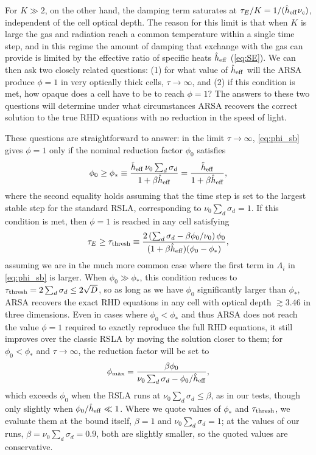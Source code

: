 \documentclass[preprint,12pt,authoryear]{elsarticle}
\begin{document}
For $K \gg 2$, on the other hand, the damping term saturates at $\tau_E/K = 1/(\hat{h}_{\rm eff}\nu_c)$, independent of the cell optical depth. The reason for this limit is that when $K$ is large the gas and radiation reach a common temperature within a single time step, and in this regime the amount of damping that exchange with the gas can provide is limited by the effective ratio of specific heats $\hat{h}_{\rm eff}$ (\autoref{eq:SE}). We can then ask two closely related questions: (1) for what value of $\hat{h}_{\rm eff}$ will the ARSA produce $\phi = 1$ in very optically thick cells, $\tau\to\infty$, and (2) if this condition is met, how opaque does a cell have to be to reach $\phi = 1$?  The answers to these two questions will determine under what circumstances ARSA recovers the correct solution to the true RHD equations with no reduction in the speed of light.

These questions are straightforward to answer: in the limit $\tau \to \infty$, \autoref{eq:phi_sb} gives $\phi = 1$ only if the nominal reduction factor $\phi_0$ satisfies
\begin{equation}
    \phi_0 \geq \phi_* \equiv \frac{\hat{h}_{\rm eff}\,\nu_0\sum_d\sigma_d}{1 +\beta\hat{h}_{\rm eff}} = \frac{\hat{h}_{\rm eff}}{1 + \beta\hat{h}_{\rm eff}},
    \label{eq:phi_star}
\end{equation}
where the second equality holds assuming that the time step is set to the largest stable step for the standard RSLA, corresponding to $\nu_0 \sum_d \sigma_d = 1$. If this condition is met, then $\phi = 1$ is reached in any cell satisfying
\begin{equation}
    \tau_E \geq \tau_{\rm thresh} \equiv \frac{2\left(\sum_d\sigma_d - \beta\phi_0/\nu_0\right)\phi_0}{(1 + \beta \hat{h}_{\rm eff})(\phi_0 - \phi_*)},
    \label{eq:tau_one}
\end{equation}
assuming we are in the much more common case where the first term in $\Lambda_i$ in \autoref{eq:phi_sb} is larger. When $\phi_0 \gg \phi_*$, this condition reduces to $\tau_{\rm thresh} = 2 \sum_d \sigma_d\leq 2\sqrt{D}$, so as long as we have $\phi_0$ significantly larger than $\phi_*$, ARSA recovers the exact RHD equations in any cell with optical depth $\gtrsim 3.46$ in three dimensions. Even in cases where $\phi_0 < \phi_*$ and thus ARSA does not reach the value $\phi = 1$ required to exactly reproduce the full RHD equations, it still improves over the classic RSLA by moving the solution closer to them; for $\phi_0 < \phi_*$ and $\tau\to\infty$, the reduction factor will be set to
\begin{equation}
    \phi_{\max} = \frac{\beta\phi_0}{\nu_0\sum_d\sigma_d - \phi_0/\hat{h}_{\rm eff}},
    \label{eq:phi_sat}
\end{equation}
which exceeds $\phi_0$ when the RSLA runs at $\nu_0\sum_d\sigma_d \leq \beta$, as in our tests, though only slightly when $\phi_0 / \hat{h}_{\rm eff} \ll 1$. Where we quote values of $\phi_*$ and $\tau_{\rm thresh}$, we evaluate them at the bound itself, $\beta = 1$ and $\nu_0\sum_d\sigma_d = 1$; at the values of our runs, $\beta = \nu_0\sum_d\sigma_d = 0.9$, both are slightly smaller, so the quoted values are conservative.
\end{document}
